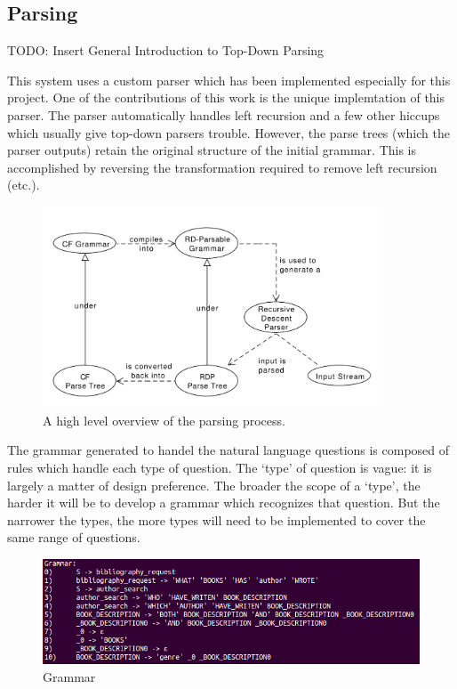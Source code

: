 \documentclass[11pt]{article}
\begin{document}
\subsection{Parsing}

TODO: Insert General Introduction to Top-Down Parsing 

This system uses a custom parser which has been implemented especially for
this project. One of the contributions of this work is the unique implemtation
of this parser. The parser automatically handles left recursion and a few other
hiccups which usually give top-down parsers trouble. However, the parse trees
(which the parser outputs) retain the original structure of the initial grammar.
This is accomplished by reversing the transformation required to remove left
recursion (etc.).

\begin{figure}[h!]
    \centering
    \includegraphics[width=0.9\textwidth,natwidth=1,natheight=1]{umlet/high_level.pdf}
    \caption{A high level overview of the parsing process.}
    \label{fig:high_level_parse}
\end{figure}

The grammar generated to handel the natural language questions
is composed of rules which handle each type of question.
The `type' of question is vague: it is largely a matter of design preference.
The broader the scope of a `type', the harder it will be to develop a grammar
which recognizes that question. But the narrower the types, the more types
will need to be implemented to cover the same range of questions.

\begin{figure}[h!]
    \centering
    \includegraphics[width=1\textwidth,natwidth=1,natheight=1]{imgs/demo/grammar.png}
    \caption{Grammar}
    \label{fig:grammar}
\end{figure}
\end{document}
